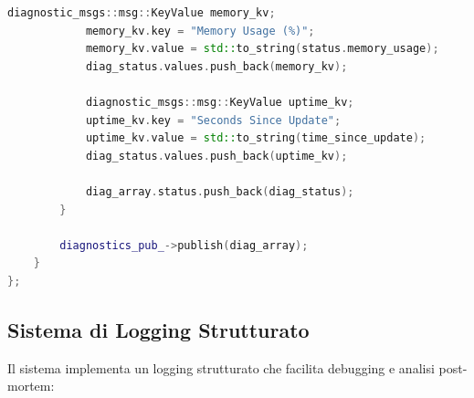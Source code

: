 \documentclass[12pt,a4paper,twoside,openright]{book}
\begin{document}
\begin{lstlisting}[language=C++, caption={Sistema di monitoraggio distribuito}]
            diagnostic_msgs::msg::KeyValue memory_kv;
            memory_kv.key = "Memory Usage (%)";
            memory_kv.value = std::to_string(status.memory_usage);
            diag_status.values.push_back(memory_kv);
            
            diagnostic_msgs::msg::KeyValue uptime_kv;
            uptime_kv.key = "Seconds Since Update";
            uptime_kv.value = std::to_string(time_since_update);
            diag_status.values.push_back(uptime_kv);
            
            diag_array.status.push_back(diag_status);
        }
        
        diagnostics_pub_->publish(diag_array);
    }
};
\end{lstlisting}

\subsection{Sistema di Logging Strutturato}

Il sistema implementa un logging strutturato che facilita debugging e analisi post-mortem:
\end{document}
